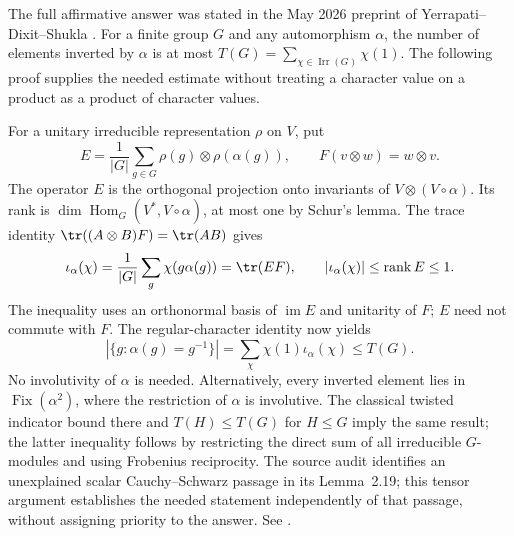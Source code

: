 The full affirmative answer was stated in the May 2026
preprint of Yerrapati--Dixit--Shukla
\cite[Theorem~3.1]{yerrapati-dixit-shukla}.
For a finite group \(G\) and any automorphism \(\alpha\),
the number of elements inverted by \(\alpha\) is at most
\(T(G)=\sum_{\chi\in\operatorname{Irr}(G)}\chi(1)\).
The following proof supplies the needed estimate without
treating a character value on a product as a product of
character values.

For a unitary irreducible representation \(\rho\) on \(V\),
put
\[
 E=\frac1{|G|}\sum_{g\in G}\rho(g)\otimes\rho(\alpha(g)),
 \qquad F(v\otimes w)=w\otimes v.
\]
The operator \(E\) is the orthogonal projection onto invariants
of \(V\otimes(V\circ\alpha)\). Its rank is
\(\dim\operatorname{Hom}_G(V^*,V\circ\alpha)\), at most one
by Schur's lemma. The trace identity
\(\tr((A\otimes B)F)=\tr(AB)\) gives
\[
 \iota_\alpha(\chi)
 =\frac1{|G|}\sum_g\chi(g\alpha(g))=\tr(EF),\qquad
 |\iota_\alpha(\chi)|\le\operatorname{rank}E\le1.
\]
The inequality uses an orthonormal basis of \(\operatorname{im}E\)
and unitarity of \(F\); \(E\) need not commute with \(F\).
The regular-character identity now yields
\[
 |\{g:\alpha(g)=g^{-1}\}|
   =\sum_\chi\chi(1)\iota_\alpha(\chi)\le T(G).
\]
No involutivity of \(\alpha\) is needed.
Alternatively, every inverted element lies in
\(\operatorname{Fix}(\alpha^2)\), where the restriction of
\(\alpha\) is involutive. The classical twisted indicator
bound there and \(T(H)\le T(G)\) for \(H\le G\) imply the
same result; the latter inequality follows by restricting
the direct sum of all irreducible \(G\)-modules and using
Frobenius reciprocity.
The source audit identifies an unexplained scalar
Cauchy--Schwarz passage in its Lemma~2.19; this tensor
argument establishes the needed statement independently of
that passage, without assigning priority to the answer.
See .
